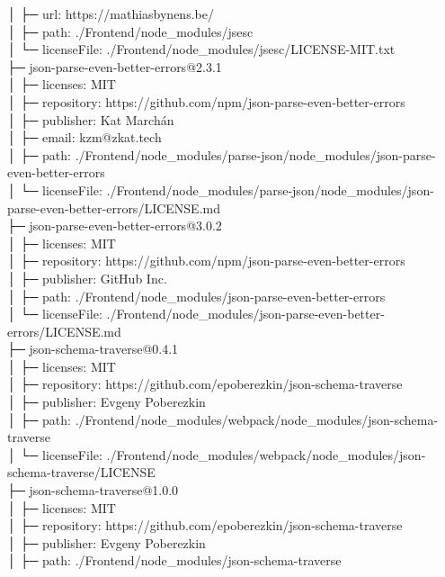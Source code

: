 \documentclass[
    paper=a4,
    twoside=false,
    parskip=half,
    listof=entryprefix,
    listof=totoc,
    index=totoc,
    bibliography=totoc,
    headsepline,
]{scrbook}
\begin{document}
    │  ├─ url: https://mathiasbynens.be/\\
    │  ├─ path: ./Frontend/node\_modules/jsesc\\
    │  └─ licenseFile: ./Frontend/node\_modules/jsesc/LICENSE-MIT.txt\\
    ├─ json-parse-even-better-errors@2.3.1\\
    │  ├─ licenses: MIT\\
    │  ├─ repository: https://github.com/npm/json-parse-even-better-errors\\
    │  ├─ publisher: Kat Marchán\\
    │  ├─ email: kzm@zkat.tech\\
    │  ├─ path: ./Frontend/node\_modules/parse-json/node\_modules/json-parse-even-better-errors\\
    │  └─ licenseFile: ./Frontend/node\_modules/parse-json/node\_modules/json-parse-even-better-errors/LICENSE.md\\
    ├─ json-parse-even-better-errors@3.0.2\\
    │  ├─ licenses: MIT\\
    │  ├─ repository: https://github.com/npm/json-parse-even-better-errors\\
    │  ├─ publisher: GitHub Inc.\\
    │  ├─ path: ./Frontend/node\_modules/json-parse-even-better-errors\\
    │  └─ licenseFile: ./Frontend/node\_modules/json-parse-even-better-errors/LICENSE.md\\
    ├─ json-schema-traverse@0.4.1\\
    │  ├─ licenses: MIT\\
    │  ├─ repository: https://github.com/epoberezkin/json-schema-traverse\\
    │  ├─ publisher: Evgeny Poberezkin\\
    │  ├─ path: ./Frontend/node\_modules/webpack/node\_modules/json-schema-traverse\\
    │  └─ licenseFile: ./Frontend/node\_modules/webpack/node\_modules/json-schema-traverse/LICENSE\\
    ├─ json-schema-traverse@1.0.0\\
    │  ├─ licenses: MIT\\
    │  ├─ repository: https://github.com/epoberezkin/json-schema-traverse\\
    │  ├─ publisher: Evgeny Poberezkin\\
    │  ├─ path: ./Frontend/node\_modules/json-schema-traverse\\
\end{document}
